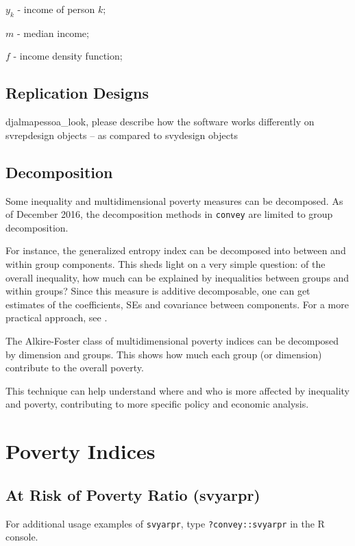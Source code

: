 \documentclass[]{book}
\begin{document}
\(y_k\) - income of person \(k\);

\(m\) - median income;

\(f\) - income density function;

\section{Replication Designs}\label{replication-designs}

djalmapessoa\_look, please describe how the software works differently
on svrepdesign objects -- as compared to svydesign objects

\section{Decomposition}\label{decomposition}

Some inequality and multidimensional poverty measures can be decomposed.
As of December 2016, the decomposition methods in \texttt{convey} are
limited to group decomposition.

For instance, the generalized entropy index can be decomposed into
between and within group components. This sheds light on a very simple
question: of the overall inequality, how much can be explained by
inequalities between groups and within groups? Since this measure is
additive decomposable, one can get estimates of the coefficients, SEs
and covariance between components. For a more practical approach, see
\citep{lima2013}.

The Alkire-Foster class of multidimensional poverty indices can be
decomposed by dimension and groups. This shows how much each group (or
dimension) contribute to the overall poverty.

This technique can help understand where and who is more affected by
inequality and poverty, contributing to more specific policy and
economic analysis.

\chapter{Poverty Indices}\label{poverty}

\section{At Risk of Poverty Ratio
(svyarpr)}\label{at-risk-of-poverty-ratio-svyarpr}

For additional usage examples of \texttt{svyarpr}, type
\texttt{?convey::svyarpr} in the R console.
\end{document}
